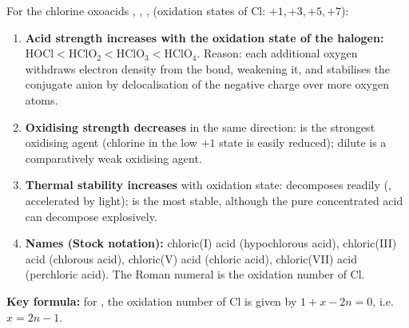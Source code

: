 \documentclass[11pt]{article}
\begin{document}
\begin{methode}
For the chlorine oxoacids , , ,  (oxidation states of Cl: $+1, +3, +5, +7$):
\begin{enumerate}
\item \textbf{Acid strength increases with the oxidation state of the halogen:} \ensuremath{\mathrm{HOCl < HClO_{2} < HClO_{3} < HClO_{4}}}. Reason: each additional oxygen withdraws electron density from the  bond, weakening it, and stabilises the conjugate anion  by delocalisation of the negative charge over more oxygen atoms.
\item \textbf{Oxidising strength decreases} in the same direction:  is the strongest oxidising agent (chlorine in the low $+1$ state is easily reduced); dilute  is a comparatively weak oxidising agent.
\item \textbf{Thermal stability increases} with oxidation state:  decomposes readily (, accelerated by light);  is the most stable, although the pure concentrated acid can decompose explosively.
\item \textbf{Names (Stock notation):}  chloric(I) acid (hypochlorous acid),  chloric(III) acid (chlorous acid),  chloric(V) acid (chloric acid),  chloric(VII) acid (perchloric acid). The Roman numeral is the oxidation number of Cl.
\end{enumerate}
\textbf{Key formula:} for , the oxidation number of Cl is given by $1 + x - 2n = 0$, i.e.\ $x = 2n - 1$.
\end{methode}
\end{document}
